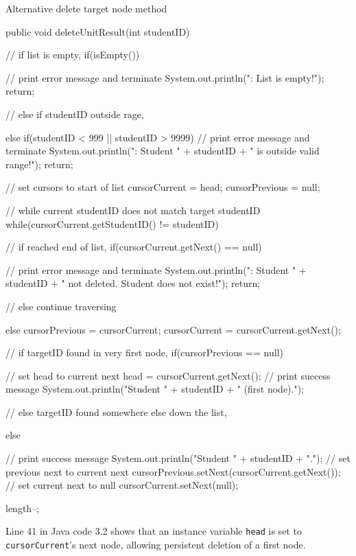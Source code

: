 \begin{listing}[H]
\caption{Alternative delete target node method}
\begin{javacode}
public void deleteUnitResult(int studentID) {

    // if list is empty,
    if(isEmpty()) {
        // print error message and terminate
        System.out.println("\nError: List is empty!");
        return;

    // else if studentID outside rage,
    } else if(studentID < 999 || studentID > 9999) {
        // print error message and terminate
        System.out.println("\nError: Student " + studentID + " is outside valid range!");
        return;
    }

    // set cursors to start of list
    cursorCurrent = head;
    cursorPrevious = null;

    // while current studentID does not match target studentID
    while(cursorCurrent.getStudentID() != studentID) {

        // if reached end of list,
        if(cursorCurrent.getNext() == null) {
            // print error message and terminate
            System.out.println("\nError: Student " + studentID 
            	+ " not deleted. Student does not exist!");
            return;

        // else continue traversing
        } else {
            cursorPrevious = cursorCurrent;
            cursorCurrent = cursorCurrent.getNext();
        }
    }

    // if targetID found in very first node,
    if(cursorPrevious == null) {

        // set head to current next
        head = cursorCurrent.getNext();
        // print success message
        System.out.println("\nDeleted Student " + studentID + " (first node).");

    // else targetID found somewhere else down the list,
    } else {

        // print success message
        System.out.println("\nDeleted Student " + studentID + ".");
        // set previous next to current next
        cursorPrevious.setNext(cursorCurrent.getNext());
        // set current next to null
        cursorCurrent.setNext(null);
    }
    length--;
}
\end{javacode}
\end{listing}

\noindent
Line 41 in Java code 3.2 shows that an instance variable \texttt{head} is set to \texttt{cursorCurrent}'s next node, allowing persistent deletion of a first node.

